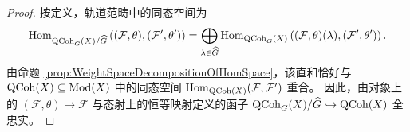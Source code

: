 \begin{proof}
按定义，轨道范畴中的同态空间为
$$
\operatorname{Hom}_{\operatorname{\mathrm{QCoh}}_G(X)/\widehat{G}}\left( (\mathcal{F}, \theta), (\mathcal{F}', \theta') \right)
=
\bigoplus_{\operatorname{\lambda} \in \widehat{G}} \operatorname{Hom}_{\operatorname{\mathrm{QCoh}}_G(X)}\left( (\mathcal{F}, \theta)(\operatorname{\lambda}), (\mathcal{F}', \theta') \right).
$$
由命题 \ref{prop:WeightSpaceDecompositionOfHomSpace}，该直和恰好与 $\operatorname{\mathrm{QCoh}}(X)\subseteq\operatorname{\mathrm{Mod}}(X)$ 中的同态空间 $\operatorname{Hom}_{\operatorname{\mathrm{QCoh}}(X)}(\mathcal{F}, \mathcal{F}')$ 重合。
因此，由对象上的 $(\mathcal{F}, \theta) \mapsto \mathcal{F}$ 与态射上的恒等映射定义的函子 $\operatorname{\mathrm{QCoh}}_G(X)/\widehat{G} \hookrightarrow \operatorname{\mathrm{QCoh}}(X)$ 全忠实。
\end{proof}

